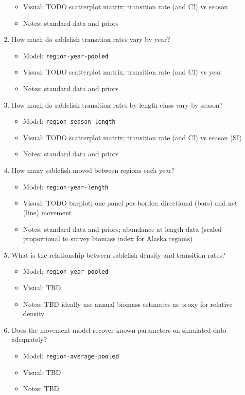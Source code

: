 \documentclass{article}
\begin{document}
\begin{enumerate}
\begin{itemize}
            \item Visual: TODO scatterplot matrix; transition rate (and CI) vs season  
            \item Notes: standard data and priors
        \end{itemize}    
    \item How much do sablefish transition rates vary by year?
        \begin{itemize}
            \item Model: \texttt{region-year-pooled}
            \item Visual: TODO scatterplot matrix; transition rate (and CI) vs year  
            \item Notes: standard data and priors
        \end{itemize}    
    \item How much do sablefish transition rates by length class vary by season?
        \begin{itemize}
            \item Model: \texttt{region-season-length}
            \item Visual: TODO scatterplot matrix; transition rate (and CI) vs season (SI)
            \item Notes: standard data and priors
        \end{itemize}
    \item How many sablefish moved between regions each year?
        \begin{itemize}
            \item Model: \texttt{region-year-length}
            \item Visual: TODO barplot; one panel per border; directional (bars) and net (line) movement
            \item Notes: standard data and priors; abundance at length data (scaled proportional to survey biomass index for Alaska regions)
        \end{itemize}    
    \item What is the relationship between sablefish density and transition rates?
        \begin{itemize}
            \item Model: \texttt{region-year-pooled}
            \item Visual: TBD
            \item Notes: TBD ideally use annual biomass estimates as proxy for relative density
        \end{itemize}    
    \item Does the movement model recover known parameters on simulated data adequately?
        \begin{itemize}
            \item Model: \texttt{region-average-pooled}
            \item Visual: TBD
            \item Notes: TBD
        \end{itemize}
\end{enumerate}
\end{document}

